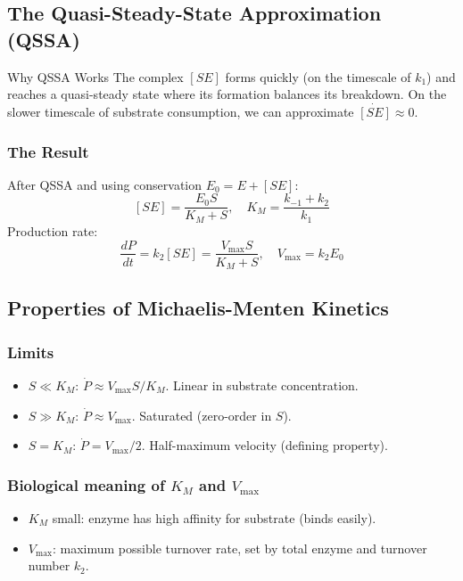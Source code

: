 \documentclass[11pt]{article}
\begin{document}
\subsection{The Quasi-Steady-State Approximation (QSSA)}

\begin{conceptbox}{Why QSSA Works}
The complex $[SE]$ forms quickly (on the timescale of $k_1$) and reaches a quasi-steady state where its formation balances its breakdown. On the slower timescale of substrate consumption, we can approximate $\dot{[SE]} \approx 0$.
\end{conceptbox}

\subsubsection{The Result}
After QSSA and using conservation $E_0 = E + [SE]$:
\[
[SE] = \frac{E_0 S}{K_M + S}, \quad K_M = \frac{k_{-1}+k_2}{k_1}
\]
Production rate:
\[
\frac{dP}{dt} = k_2[SE] = \frac{V_{\max} S}{K_M + S}, \quad V_{\max} = k_2 E_0
\]

\subsection{Properties of Michaelis-Menten Kinetics}

\subsubsection{Limits}
\begin{itemize}
\item $S \ll K_M$: $\dot P \approx V_{\max} S/K_M$. Linear in substrate concentration.
\item $S \gg K_M$: $\dot P \approx V_{\max}$. Saturated (zero-order in $S$).
\item $S = K_M$: $\dot P = V_{\max}/2$. Half-maximum velocity (defining property).
\end{itemize}

\subsubsection{Biological meaning of $K_M$ and $V_{\max}$}
\begin{itemize}
\item $K_M$ small: enzyme has high affinity for substrate (binds easily).
\item $V_{\max}$: maximum possible turnover rate, set by total enzyme and turnover number $k_2$.
\end{itemize}
\end{document}
